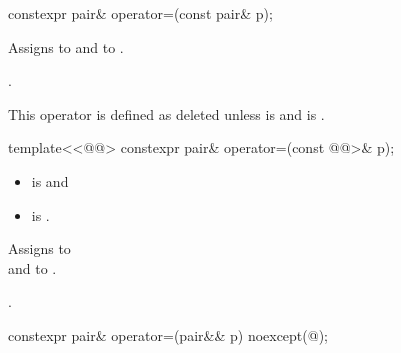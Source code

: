 \documentclass{wg21}
\begin{document}
%
\begin{itemdecl}
    constexpr pair& operator=(const pair& p);
\end{itemdecl}

\begin{itemdescr}
    \pnum
    \effects
    Assigns  to  and  to .

    \pnum
    \returns
    .

    \pnum
    \remarks
    This operator is defined as deleted unless
     is  and
     is .
\end{itemdescr}

%
\begin{itemdecl}
    template<<@@>
    constexpr pair& operator=(const @@>& p);
\end{itemdecl}

\begin{itemdescr}
    \pnum
    \constraints
    \begin{itemize}
        \item {} is  and
        \item {} is .
    \end{itemize}

    \pnum
    \effects
    Assigns  to  \\
    and  to .

    \pnum
    \returns
    .
\end{itemdescr}

%
\begin{itemdecl}
    constexpr pair& operator=(pair&& p) noexcept(@\seebelow@);
\end{itemdecl}
\end{document}
